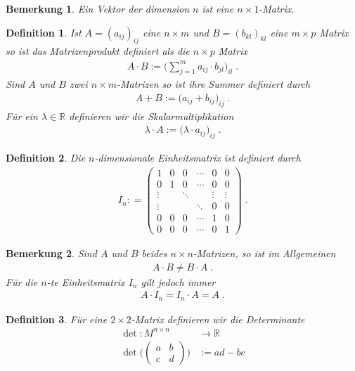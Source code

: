 \documentclass[]{article}
\newtheorem{Definition}{Definition}
\newtheorem{Bemerkung}{Bemerkung}
\begin{document}
\begin{Bemerkung}
Ein Vektor der dimension $n$ ist eine $n \times 1$-Matrix.
\end{Bemerkung}
\begin{Definition}
Ist $A = (a_{ij})_{ij}$ eine $n \times m$ und $B = (b_{kl})_{kl}$ eine $m \times p$ Matrix so
ist das Matrizenprodukt definiert als die $n \times p$ Matrix
\begin{align*}
A \cdot B := \Biggl( \sum_{j=1}^{m}a_{ij} \cdot b_{jl} \Biggr)_{il} \; .
\end{align*}
Sind $A$ und $B$  zwei $n \times m$-Matrizen so ist ihre Summer definiert durch 
\begin{align*}
A + B := \biggl( a_{ij} + b_{ij} \biggr)_{ij} \;.
\end{align*}
Für ein $\lambda \in \mathbb{R}$ definieren wir die Skalarmultiplikation
\begin{align*}
\lambda \cdot A := \biggl( \lambda \cdot a_{ij} \biggr)_{ij} \;.
\end{align*}
\end{Definition}


\begin{Definition}
Die $n$-dimensionale Einheitsmatrix ist definiert durch
\begin{align*}
I_n : = \begin{pmatrix}
1 & 0 & 0 & \cdots & 0 & 0 \\
0 & 1 & 0 & \cdots & 0 & 0 \\
\vdots &  & \ddots &  & \vdots & \vdots \\
\vdots &  &  &  \ddots & 0 & 0 \\
0 & 0 & 0 & \cdots & 1 & 0 \\
0 & 0 & 0 & \cdots & 0 & 1
\end{pmatrix} \; .
\end{align*}
\end{Definition}

\begin{Bemerkung}
Sind $A$ und $B$ beides $n\times n$-Matrizen, so ist im Allgemeinen
\begin{align*}
A \cdot B \neq B \cdot A \; .
\end{align*}
Für die $n$-te Einheitsmatrix $I_n$ gilt jedoch immer
\begin{align*}
A \cdot I_n =  I_n \cdot A  = A \; .
\end{align*}
\end{Bemerkung}


\begin{Definition}
Für eine $2 \times 2$-Matrix definieren wir die Determinante
\begin{align*}
\det : M^{n \times n}  & \to \mathbb{R} \\
\det \biggl ( 
\begin{pmatrix}
a & b \\ c & d
\end{pmatrix}
 \biggr)  & := ad - bc
\end{align*}
\end{Definition}
\end{document}
